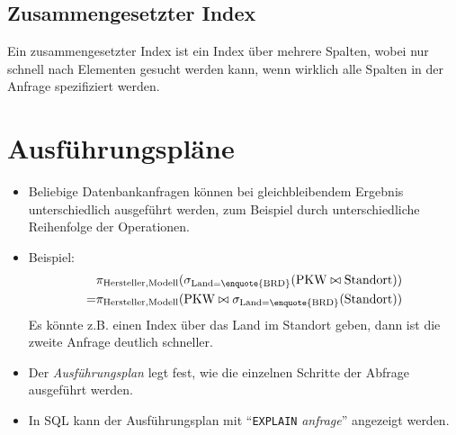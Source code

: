         \subsection{Zusammengesetzter Index} %
            Ein zusammengesetzter Index ist ein Index über mehrere Spalten, wobei nur schnell nach Elementen gesucht werden kann, wenn wirklich alle Spalten in der Anfrage spezifiziert werden.

    \section{Ausführungspläne} %
        \begin{itemize}
        	\item Beliebige Datenbankanfragen können bei gleichbleibendem Ergebnis unterschiedlich ausgeführt werden, zum Beispiel durch unterschiedliche Reihenfolge der Operationen.
        	\item Beispiel:
        		\begin{align*}
            		  & \pi _ { \text{Hersteller}, \text{Modell} } (\sigma _ { \text{Land} = \text{\enquote{BRD}} } (\text{PKW} \bowtie \text{Standort})) \\
            		= & \pi _ { \text{Hersteller}, \text{Modell} } (\text{PKW} \bowtie \sigma _ { \text{Land} = \text{\enquote{BRD}} } (\text{Standort}))
        		\end{align*}
        		Es könnte z.B. einen Index über das Land im Standort geben, dann ist die zweite Anfrage deutlich schneller.
        	\item Der \textit{Ausführungsplan} legt fest, wie die einzelnen Schritte der Abfrage ausgeführt werden.
        	\item In SQL kann der Ausführungsplan mit \enquote{\lstinline|EXPLAIN| \textit{anfrage}} angezeigt werden.
        \end{itemize}

